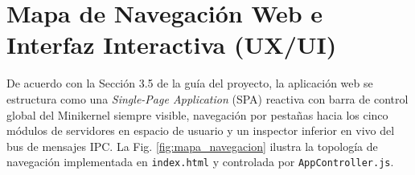 \documentclass[10pt,twocolumn,letterpaper]{article}
\begin{document}
\section{Mapa de Navegaci\'on Web e Interfaz Interactiva (UX/UI)}

De acuerdo con la Secci\'on 3.5 de la gu\'ia del proyecto, la aplicaci\'on web se estructura como una \textit{Single-Page Application} (SPA) reactiva con barra de control global del Minikernel siempre visible, navegaci\'on por pesta\~nas hacia los cinco m\'odulos de servidores en espacio de usuario y un inspector inferior en vivo del bus de mensajes IPC. La Fig. \ref{fig:mapa_navegacion} ilustra la topolog\'ia de navegaci\'on implementada en \texttt{index.html} y controlada por \texttt{AppController.js}.
\end{document}
